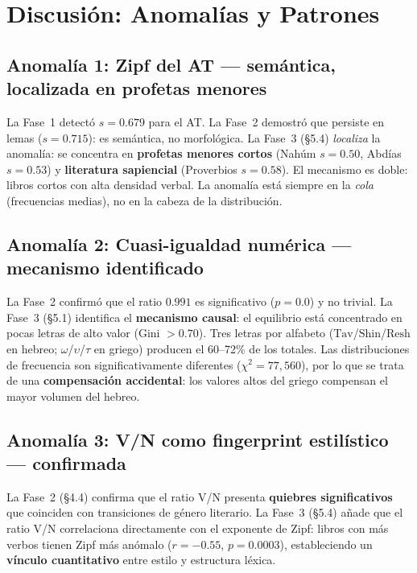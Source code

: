 \documentclass[12pt,a4paper]{article}
\newcommand{\tav}{\mathrm{Tav}}
\newcommand{\shin}{\mathrm{Shin}}
\newcommand{\resh}{\mathrm{Resh}}
\begin{document}
\section{Discusi\'on: Anomal\'ias y Patrones}

\subsection{Anomal\'ia 1: Zipf del AT --- sem\'antica, localizada en profetas menores}

La Fase~1 detect\'o $s = 0.679$ para el AT. La Fase~2 demostr\'o que persiste en lemas
($s = 0.715$): es sem\'antica, no morfol\'ogica. La Fase~3 (\S5.4) \emph{localiza} la anomal\'ia:
se concentra en \textbf{profetas menores cortos} (Nah\'um $s=0.50$, Abd\'ias $s=0.53$) y
\textbf{literatura sapiencial} (Proverbios $s=0.58$). El mecanismo es doble: libros cortos
con alta densidad verbal. La anomal\'ia est\'a siempre en la \emph{cola} (frecuencias medias),
no en la cabeza de la distribuci\'on.

\subsection{Anomal\'ia 2: Cuasi-igualdad num\'erica --- mecanismo identificado}

La Fase~2 confirm\'o que el ratio $0.991$ es significativo ($p = 0.0$) y no trivial.
La Fase~3 (\S5.1) identifica el \textbf{mecanismo causal}: el equilibrio est\'a
concentrado en pocas letras de alto valor (Gini $> 0.70$). Tres letras por alfabeto
($\tav$/$\shin$/$\resh$ en hebreo; $\omega$/$\upsilon$/$\tau$ en griego) producen
el 60--72\% de los totales. Las distribuciones de frecuencia son significativamente
diferentes ($\chi^2 = 77{,}560$), por lo que se trata de una \textbf{compensaci\'on accidental}:
los valores altos del griego compensan el mayor volumen del hebreo.

\subsection{Anomal\'ia 3: V/N como fingerprint estil\'istico --- confirmada}

La Fase~2 (\S4.4) confirma que el ratio V/N presenta \textbf{quiebres significativos}
que coinciden con transiciones de g\'enero literario. La Fase~3 (\S5.4) a\~nade que
el ratio V/N correlaciona directamente con el exponente de Zipf: libros con m\'as verbos
tienen Zipf m\'as an\'omalo ($r = -0.55$, $p = 0.0003$), estableciendo un
\textbf{v\'inculo cuantitativo} entre estilo y estructura l\'exica.
\end{document}
